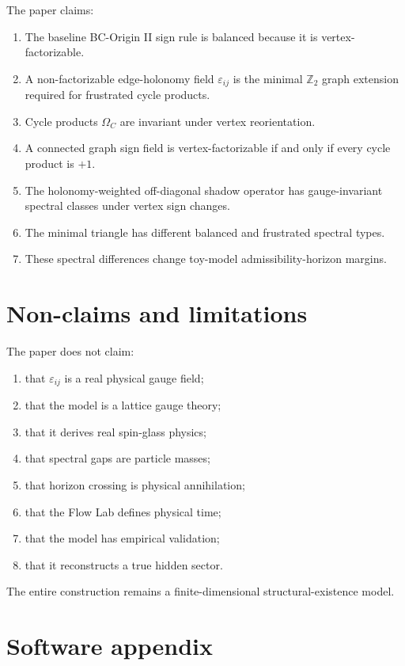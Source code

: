 \documentclass[11pt]{article}
\begin{document}
The paper claims:
\begin{enumerate}[leftmargin=2em]
\item The baseline BC-Origin II sign rule is balanced because it is vertex-factorizable.
\item A non-factorizable edge-holonomy field $\varepsilon_{ij}$ is the minimal $\mathbb Z_2$ graph extension required for frustrated cycle products.
\item Cycle products $\Omega_C$ are invariant under vertex reorientation.
\item A connected graph sign field is vertex-factorizable if and only if every cycle product is $+1$.
\item The holonomy-weighted off-diagonal shadow operator has gauge-invariant spectral classes under vertex sign changes.
\item The minimal triangle has different balanced and frustrated spectral types.
\item These spectral differences change toy-model admissibility-horizon margins.
\end{enumerate}

\section{Non-claims and limitations}

The paper does not claim:
\begin{enumerate}[leftmargin=2em]
\item that $\varepsilon_{ij}$ is a real physical gauge field;
\item that the model is a lattice gauge theory;
\item that it derives real spin-glass physics;
\item that spectral gaps are particle masses;
\item that horizon crossing is physical annihilation;
\item that the Flow Lab defines physical time;
\item that the model has empirical validation;
\item that it reconstructs a true hidden sector.
\end{enumerate}

The entire construction remains a finite-dimensional structural-existence model.

\section{Software appendix}
\end{document}
